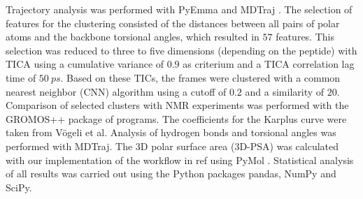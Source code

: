 Trajectory analysis was performed with PyEmma \cite{Scherer2015} and MDTraj \cite{McGibbon2015}. 
The selection of features for the clustering consisted of the distances between all pairs of polar atoms and the backbone torsional angles, which resulted in $57$ features. 
This selection was reduced to three to five dimensions (depending on the peptide) with TICA \cite{Molgedey1994} using a cumulative variance of $0.9$ as criterium and a TICA correlation lag time of $50~ps$. 
Based on these TICs, the frames were clustered with a common nearest neighbor (CNN) algorithm \cite{Keller2010, Weiß2021} using a cutoff of $0.2$ and a similarity of $20$. 
Comparison of selected clusters with NMR experiments was performed with the GROMOS++ package of programs. \cite{Eichenberger2011}
The coefficients for the Karplus curve were taken from Vögeli et al. \cite{Voegeli2015}
Analysis of hydrogen bonds and torsional angles was performed with MDTraj. 
The 3D polar surface area (3D-PSA) was calculated with our implementation \cite{Witek2019} of the workflow in ref \cite{Tyagi2018} using PyMol \cite{DeLano2020}.
Statistical analysis of all results was carried out using the Python packages pandas, NumPy and SciPy.\cite{Virtanen2020}

